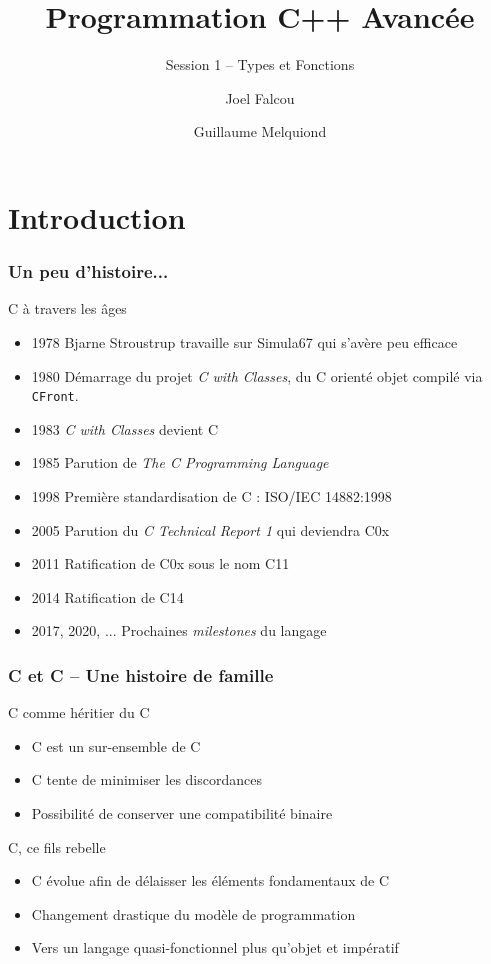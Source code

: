 \documentclass[svgnames]{beamer}
\title{Programmation C++ Avancée}
\subtitle{Session 1 -- Types et Fonctions}
\author{Joel Falcou \and Guillaume Melquiond}
\institute{Laboratoire de Recherche en Informatique}
\date{}
\def\C++{\textup{C}\nolinebreak[4]\hspace{-.05em}\raisebox{.4ex}{\relsize{-3}{\textbf{++}}}}
\begin{document}


\begin{frame}[plain]
\titlepage
\end{frame}
\setcounter{framenumber}{0}

\section{Introduction}
\frame
{
  \frametitle{Un peu d'histoire...}
  \begin{block}{\C++ à travers les âges}
  \begin{itemize}
  \footnotesize
  \item 1978 Bjarne Stroustrup travaille sur Simula67 qui s'avère peu efficace
  \item 1980 Démarrage du projet \textit{C with Classes}, du C orienté objet compilé via \texttt{CFront}.
  \item 1983 \textit{C with Classes} devient \C++
  \item 1985 Parution de \textit{The \C++ Programming Language}
  \item 1998 Première standardisation de \C++ : ISO/IEC 14882:1998
  \item 2005 Parution du \textit{\C++ Technical Report 1} qui deviendra \C++0x
  \item 2011 Ratification de \C++0x sous le nom \C++11
  \item 2014 Ratification de \C++14
  \item 2017, 2020, ... Prochaines \textit{milestones} du langage
  \end{itemize}
  \end{block}
}

\frame
{
  \frametitle{\C++ et C -- Une histoire de famille}
  \begin{block}{\C++ comme héritier du C}
  \begin{itemize}
  \item \C++ est un sur-ensemble de C
  \item \C++ tente de minimiser les discordances
  \item Possibilité de conserver une compatibilité binaire
  \end{itemize}
  \end{block}

  \begin{block}{\C++, ce fils rebelle}
  \begin{itemize}
  \item \C++ évolue afin de délaisser les éléments fondamentaux de C
  \item Changement drastique du modèle de programmation
  \item Vers un langage quasi-fonctionnel plus qu'objet et impératif
  \end{itemize}
  \end{block}
}
\end{document}

